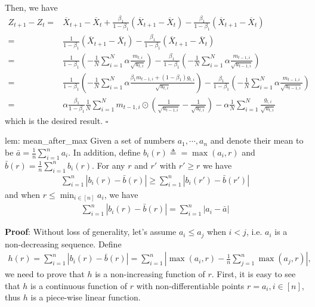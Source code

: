 \documentclass{article} %
\begin{document}
Then, we have 
\begin{align}
Z_{t+1} - Z_t =& \overline X_{t+1} - \overline X_{t} + \frac{\beta_1}{1-\beta_1} (\overline X_{t+1}- \overline X_t) - \frac{\beta_1}{1-\beta_1} (\overline X_{t+1}- \overline X_t) \nonumber \\
= &  \frac{1}{1-\beta_1} (\overline X_{t+1}- \overline X_t) - \frac{\beta_1}{1-\beta_1} (\overline X_{t+1}- \overline X_t) \nonumber \\
= & \frac{1}{1-\beta_1} \left(- \frac{1}{N} \sum_{i=1}^N   \alpha \frac{m_{t,i}}{\sqrt{u_{t,i}}}\right) - \frac{\beta_1}{1-\beta_1} \left(- \frac{1}{N} \sum_{i=1}^N   \alpha \frac{m_{t-1,i}}{\sqrt{u_{t-1,i}}}\right) \nonumber \\
= & \frac{1}{1-\beta_1} \left(- \frac{1}{N} \sum_{i=1}^N   \alpha \frac{\beta_1 m_{t-1,i} + (1-\beta_1) g_{t,i}}{\sqrt{u_{t,i}}}\right) - \frac{\beta_1}{1-\beta_1} \left(- \frac{1}{N} \sum_{i=1}^N   \alpha \frac{m_{t-1,i}}{\sqrt{u_{t-1,i}}}\right) \nonumber \\
= & \alpha \frac{\beta_1}{1-\beta_1}  \frac{1}{N} \sum_{i=1}^N m_{t-1	,i} \odot (\frac{1}{\sqrt{u_{t-1,i}}} - \frac{1}{\sqrt{u_{t,i}}}) - \alpha \frac{1}{N} \sum_{i=1}^N \frac{g_{t,i}}{\sqrt{u_{t,i}}}
\end{align}
which is the desired result. \hfill $\square$

\begin{replemma}{lem: mean_after_max}
	Given  a set of numbers $a_1,\cdots,a_n$ and denote their mean to be $\bar a = \frac{1}{n}\sum_{i=1}^n a_i$. In addition, define $b_i(r) \triangleq = \max(a_i,r)$ and $\bar b (r) =  \frac{1}{n}\sum_{i=1}^n b_i(r)$. For any $r$ and $r'$ with $r' \geq r$ we have 
	\begin{align}\label{eq: r_decrease}
	\sum_{i=1}^n |b_i(r) - \bar b(r)| \geq \sum_{i=1}^n |b_i(r') - \bar b(r')|
	\end{align}
	and when $r \leq \min_{i \in [n]} a_i$, we have
	\begin{align}\label{eq: r_reduce}
	\sum_{i=1}^n |b_i(r) - \bar b(r)| =   \sum_{i=1}^n |a_i - \bar a|
	\end{align}
\end{replemma}
{ \textbf{Proof}:}
Without loss of generality, let's assume $a_i \leq a_j$ when $i < j$, i.e. $a_i$ is a non-decreasing sequence. Define 
\begin{align}
h(r) = \sum_{i=1}^n |b_i(r) - \bar b(r)| = \sum_{i=1}^n |\max (a_i,r) - \frac{1}{n}\sum_{j=1}^n \max(a_j,r)|,
\end{align}
we need to prove that $h$ is a non-increasing function of $r$. First,
it is easy to see that $h$ is a continuous function of $r$ with non-differentiable points $r = a_i, i \in [n]$, thus $h$ is a piece-wise linear function.
\end{document}
